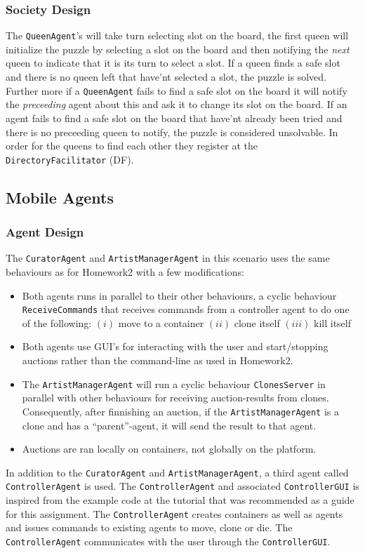 \documentclass[a4paper, 11pt]{article}
\begin{document}
\subsubsection*{Society Design}
The \texttt{QueenAgent}'s will take turn selecting slot on the board, the first queen will initialize the puzzle by selecting a slot on the board and then notifying the \textit{next} queen to indicate that it is its turn to select a slot. If a queen finds a safe slot and there is no queen left that have'nt selected a slot, the puzzle is solved. Further more if a \texttt{QueenAgent} fails to find a safe slot on the board it will notify the \textit{preceeding} agent about this and ask it to change its slot on the board. If an agent fails to find a safe slot on the board that have'nt already been tried and there is no preceeding queen to notify, the puzzle is considered unsolvable. In order for the queens to find each other they register at the \texttt{DirectoryFacilitator} (DF).
\subsection*{Mobile Agents}
\subsubsection*{Agent Design}
The \texttt{CuratorAgent} and \texttt{ArtistManagerAgent} in this scenario uses the same behaviours as for Homework2 with a few modifications:
\begin{itemize}
\item Both agents runs in parallel to their other behaviours, a cyclic behaviour \texttt{ReceiveCommands} that receives commands from a controller agent to do one of the following: $(i)$ move to a container $(ii)$ clone itself $(iii)$ kill itself
\item Both agents use GUI's for interacting with the user and start/stopping auctions rather than the command-line as used in Homework2.
\item The \texttt{ArtistManagerAgent} will run a cyclic behaviour \texttt{ClonesServer} in parallel with other behaviours for receiving auction-results from clones. Consequently, after finnishing an auction, if the \texttt{ArtistManagerAgent} is a clone and has a ``parent''-agent, it will send the result to that agent.
\item Auctions are ran locally on containers, not globally on the platform.
\end{itemize}
In addition to the \texttt{CuratorAgent} and \texttt{ArtistManagerAgent}, a third agent called \texttt{ControllerAgent} is used. The \texttt{ControllerAgent} and associated \texttt{ControllerGUI} is inspired from the example code at the tutorial \citep{jade_tutorial2} that was recommended as a guide for this assignment. The \texttt{ControllerAgent} creates containers as well as agents and issues commands to existing agents to move, clone or die. The \texttt{ControllerAgent} communicates with the user through the \texttt{ControllerGUI}.
\end{document}
